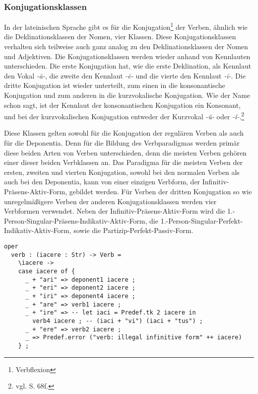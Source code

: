 \subsubsection{Konjugationsklassen}
In der lateinischen Sprache gibt es für die Konjugation\footnote{Verbflexion} der Verben, ähnlich wie die Deklinationsklassen der Nomen, vier Klassen. Diese Konjugationsklassen verhalten sich teilweise auch ganz analog zu den Deklinationsklassen der Nomen und Adjektiven. Die Konjugationsklassen werden wieder anhand von Kennlauten unterschieden. Die erste Konjugation hat, wie die erste Deklination, als Kennlaut den Vokal \textit{-ā-}, die zweite den Kennlaut \textit{-ē-} und die vierte den Kennlaut \textit{-ī-}. Die dritte Konjugation ist wieder unterteilt, zum einen in die konsonantische Konjugation und zum anderen in die kurzvokalische Konjugation. Wie der Name schon sagt, ist der Kennlaut der konsonantischen Konjugation ein Konsonant, und bei der kurzvokalischen Konjugation entweder der Kurzvokal \textit{-ǔ-} oder \textit{-ǐ-}.\footnote{vgl. \cite{BAYER-LINDAUER1994} S. 68f.} \par
Diese Klassen gelten sowohl für die Konjugation der regulären Verben als auch für die Deponentia. Denn für die Bildung des Verbparadigmas werden primär diese beiden Arten von Verben unterschieden, denn die meisten Verben gehören einer dieser beiden Verbklassen an. Das Paradigma für die meisten Verben der ersten, zweiten und vierten Konjugation, sowohl bei den normalen Verben als auch bei den Deponentia, kann von einer einzigen Verbform, der Infinitiv-Präsens-Aktiv-Form, gebildet werden. Für Verben der dritten Konjugation so wie unregelmäßigere Verben der anderen Konjugationsklassen werden vier Verbformen verwendet. Neben der Infinitiv-Präsens-Aktiv-Form wird die 1.-Person-Singular-Präsens-Indikativ-Aktiv-Form, die 1.-Person-Singular-Perfekt-Indikativ-Aktiv-Form, sowie die Partizip-Perfekt-Passiv-Form.  \par
\begin{lstlisting}[float=h!tp,caption={Smart Paradigm für eine Verbform (vgl. \textbf{MorphoLat.gf})},label={GF-Morpho-Verb},basicstyle=\small]
oper
  verb : (iacere : Str) -> Verb = 
    \iacere ->
    case iacere of {
      _ + "ari" => deponent1 iacere ;
      _ + "eri" => deponent2 iacere ;
      _ + "iri" => deponent4 iacere ;
      _ + "are" => verb1 iacere ;
      _ + "ire" => -- let iaci = Predef.tk 2 iacere in
        verb4 iacere ; -- (iaci + "vi") (iaci + "tus") ;
      _ + "ere" => verb2 iacere ;
      _ => Predef.error ("verb: illegal infinitive form" ++ iacere) 
    } ;
\end{lstlisting}
